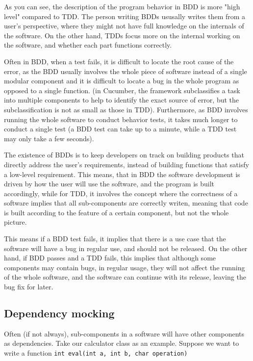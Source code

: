 As you can see, the description of the program behavior in BDD is more "high level" compared to TDD. The person writing BDDs ususally writes them from a user's perspective, where they might not have full knowledge on the internals of the software. On the other hand, TDDs focus more on the internal working on the software, and whether each part functions correctly. 

Often in BDD, when a test fails, it is difficult to locate the root cause of the error, as the BDD usually involves the whole piece of software instead of a single modular component and it is difficult to locate a bug in the whole program as opposed to a single function. (in Cucumber, the framework subclassifies a task into multiple components to help to identify the exact source of error, but the subclassification is not as small as those in TDD). Furthermore, as BDD involves running the whole software to conduct behavior tests, it takes much longer to conduct a single test (a BDD test can take up to a minute, while a TDD test may only take a few seconds). 

The existence of BDDs is to keep developers on track on building products that directly address the user's requirements, instead of building functions that satisfy a low-level requirement. This means, that in BDD the software development is driven by how the user will use the software, and the program is built accordingly, while for TDD, it involves the concept where the correctness of a software implies that all sub-components are correctly writen, meaning that code is built according to the feature of a certain component, but not the whole picture. 

This means if a BDD test fails, it implies that there is a use case that the software will have a bug in regular use, and should not be released. On the other hand, if BDD passes and a TDD fails, this implies that although some components may contain bugs, in regular usage, they will not affect the running of the whole software, and the software can continue with its release, leaving the bug fix for later. 

\subsection{Dependency mocking}

Often (if not always), sub-components in a software will have other components as dependencies. Take our calculator class as an example. Suppose we want to write a function \texttt{int eval(int a, int b, char operation)}

